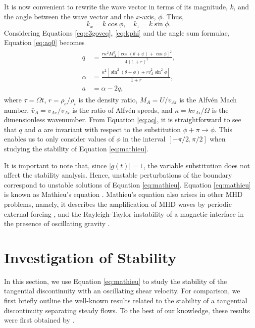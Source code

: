 \documentclass[12pt]{ociamthesis}
\begin{document}
It is now convenient to rewrite the wave vector in terms of its magnitude, $k$, and the angle between the wave vector and the $x$-axis, $\phi$.
Thus,
%
\begin{equation}
\label{eq:kphi}
k_x = k\cos\phi, \quad k_z = k\sin\phi.
\end{equation}
%
Considering Equations \eqref{eq:c3goveq}, \eqref{eq:kphi} and the angle sum formulae, Equation \eqref{eq:aq0} becomes
%
\begin{align}
\begin{split}
\label{eq:aq}
q & = \frac{r \kappa^2 M_A^2[\cos(\theta + \phi) + \cos\phi]^2}{4 (1 + r)^2},
\\
\alpha & = \frac{\kappa^2[\sin^2(\theta + \phi) + r \bar v_A^2 \sin^2\phi]}{1 + r}, 
\\
a & = \alpha - 2 q,
\end{split}
\end{align}
%
where $\tau = \Omega t$\/, $r = \rho_e / \rho_i$ is the density ratio, $M_A = U / v_{Ai}$ is the Alfv\'en Mach number,  $\bar v_A = v_{Ae} / v_{Ai}$ is the ratio of Alfv\'en speeds, and $\kappa = k v_{Ai} / \Omega$ is the dimensionless wavenumber.
From Equation \eqref{eq:aq}, it is straightforward to see that $q$ and $a$ are invariant with respect to the substitution $\phi + \pi \to \phi$.
This enables us to only consider values of $\phi$ in the interval $[-\pi/2, \pi/2]$ when studying the stability of Equation \eqref{eq:mathieu}.

It is important to note that, since $|g(t)| = 1$, the variable substitution does not affect the stability analysis.
Hence, unstable perturbations of the boundary correspond to unstable solutions of Equation \eqref{eq:mathieu}.
Equation \eqref{eq:mathieu} is known as Mathieu's equation \citep{McLachlan1946}.
Mathieu's equation also arises in other MHD problems, namely, it describes the amplification of MHD waves by periodic external forcing \citep[e.g.][]{Zaqarashvili2000,Zaqarashvili2002,Zaqarashvili2005}, and the Rayleigh-Taylor instability of a magnetic interface in the presence of oscillating gravity \citep{Ruderman2018}.

\section{Investigation of Stability}
\label{sec:stab}

In this section, we use Equation \eqref{eq:mathieu} to study the stability of the tangential discontinuity with an oscillating shear velocity.
For comparison, we first briefly outline the well-known results related to the stability of a tangential discontinuity separating steady flows.
To the best of our knowledge, these results were first obtained by \cite{Syrovatskii1957} \citep[see also][]{Chandrasekhar1961}.
\vspace*{3mm}
\end{document}
